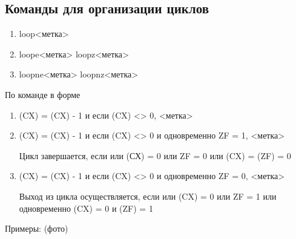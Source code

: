 \subsection{Команды для организации циклов}
\begin{enumerate}
    \item loop<метка>
    \item loope<метка>      loopz<метка>
    \item loopne<метка>     loopnz<метка>
\end{enumerate}
По команде в форме 
\begin{enumerate}
    \item (CX) = (CX) - 1 и если (CX) <> 0, <метка>
    \item (CX) = (CX) - 1 и если (CX) <> 0 и одновременно ZF = 1, <метка> 
    
    Цикл завершается, если или (СХ) = 0 или ZF = 0 или (CX) = (ZF) = 0
    \item (CX) = (CX) - 1 и если (CX) <> 0 и одновременно ZF = 0, <метка> 
    
    Выход из цикла осуществляется, если или (CX) = 0 или ZF = 1 или одновременно (CX) = 0 и (ZF) = 1
\end{enumerate}
Примеры: (фото)

